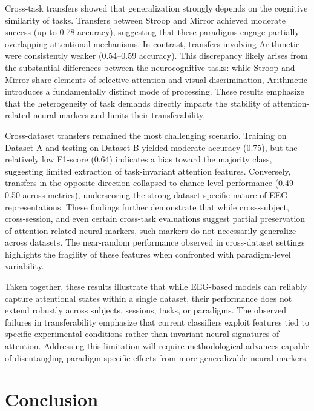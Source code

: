 \documentclass[utf8]{FrontiersinHarvard} %
\begin{document}
Cross-task transfers showed that generalization strongly depends on the cognitive similarity of tasks. Transfers between Stroop and Mirror achieved moderate success (up to 0.78 accuracy), suggesting that these paradigms engage partially overlapping attentional mechanisms. In contrast, transfers involving Arithmetic were consistently weaker (0.54–0.59 accuracy). This discrepancy likely arises from the substantial differences between the neurocognitive tasks: while Stroop and Mirror share elements of selective attention and visual discrimination, Arithmetic introduces a fundamentally distinct mode of processing. These results emphasize that the heterogeneity of task demands directly impacts the stability of attention-related neural markers and limits their transferability.

Cross-dataset transfers remained the most challenging scenario. Training on Dataset A and testing on Dataset B yielded moderate accuracy (0.75), but the relatively low F1-score (0.64) indicates a bias toward the majority class, suggesting limited extraction of task-invariant attention features. Conversely, transfers in the opposite direction collapsed to chance-level performance (0.49–0.50 across metrics), underscoring the strong dataset-specific nature of EEG representations. These findings further demonstrate that while cross-subject, cross-session, and even certain cross-task evaluations suggest partial preservation of attention-related neural markers, such markers do not necessarily generalize across datasets. The near-random performance observed in cross-dataset settings highlights the fragility of these features when confronted with paradigm-level variability.

Taken together, these results illustrate that while EEG-based models can reliably capture attentional states within a single dataset, their performance does not extend robustly across subjects, sessions, tasks, or paradigms. The observed failures in transferability emphasize that current classifiers exploit features tied to specific experimental conditions rather than invariant neural signatures of attention. Addressing this limitation will require methodological advances capable of disentangling paradigm-specific effects from more generalizable neural markers.

\section{Conclusion}
\end{document}
